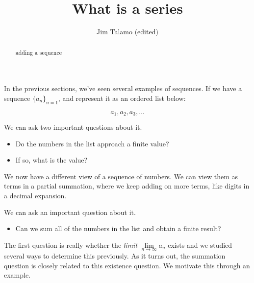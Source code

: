 \documentclass{ximera}
\author{Jim Talamo (edited)}
\title{What is a series}
\begin{document}
\begin{abstract}
adding a sequence
\end{abstract}
\maketitle

In the previous sections, we've seen several examples of sequences.  If we have a sequence $\{a_n\}_{n=1}$, and represent it as an ordered list below: 

\[
a_1, a_2, a_3 , \ldots
\]

We can ask two important questions about it.

\begin{itemize}
\item Do the numbers in the list approach a finite value?
\item If so, what is the value?
\end{itemize}



We now have a different view of a sequence of numbers.  We can view them as terms in a partial summation, where we keep adding on more terms, like digits in a decimal expansion.


We can ask an important question about it.

\begin{itemize}
\item Can we sum all of the numbers in the list and obtain a finite result?
\end{itemize}





The first question is really whether the \emph{limit} $\lim\limits_{n \to \infty} a_n$ exists and we studied several ways to determine this previously.  As it turns out, the summation question is closely related to this existence question.  We motivate this through an example.
\end{document}
